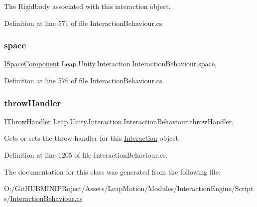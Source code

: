 The Rigidbody associated with this interaction object. 



Definition at line 571 of file Interaction\+Behaviour.\+cs.

\mbox{\label{class_leap_1_1_unity_1_1_interaction_1_1_interaction_behaviour_a2823985d77f87e529feddc58eeb6f8be}} 
\subsubsection{\texorpdfstring{space}{space}}
{\footnotesize\ttfamily \mbox{\hyperlink{interface_leap_1_1_unity_1_1_space_1_1_i_space_component}{I\+Space\+Component}} Leap.\+Unity.\+Interaction.\+Interaction\+Behaviour.\+space\hspace{0.3cm}{\ttfamily [get]}, {}}



Definition at line 576 of file Interaction\+Behaviour.\+cs.

\mbox{\label{class_leap_1_1_unity_1_1_interaction_1_1_interaction_behaviour_a3b24ac497fcbece385d43065bdaee230}} 
\subsubsection{\texorpdfstring{throwHandler}{throwHandler}}
{\footnotesize\ttfamily \mbox{\hyperlink{interface_leap_1_1_unity_1_1_interaction_1_1_i_throw_handler}{I\+Throw\+Handler}} Leap.\+Unity.\+Interaction.\+Interaction\+Behaviour.\+throw\+Handler\hspace{0.3cm}{\ttfamily [get]}, {\ttfamily [set]}}



Gets or sets the throw handler for this \mbox{\hyperlink{namespace_leap_1_1_unity_1_1_interaction}{Interaction}} object. 



Definition at line 1205 of file Interaction\+Behaviour.\+cs.



The documentation for this class was generated from the following file\+:\begin{DoxyCompactItemize}
\item 
O\+:/\+Git\+H\+U\+B\+M\+I\+N\+I\+P\+Roject/\+Assets/\+Leap\+Motion/\+Modules/\+Interaction\+Engine/\+Scripts/\mbox{\hyperlink{_interaction_behaviour_8cs}{Interaction\+Behaviour.\+cs}}\end{DoxyCompactItemize}

